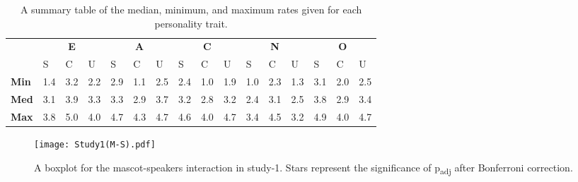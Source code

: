 \begin{table}[hbt!]
    \renewcommand{\arraystretch}{1}
    \begin{center}
        \begin{tabular}{p{}|
        p{}|p{}|p{}||
        p{}|p{}|p{}||
        p{}|p{}|p{}||
        p{}|p{}|p{}||
        p{}|p{}|p{}|}
            \cline{2-16}
            & \multicolumn{3}{c||}{\textbf{E}} & \multicolumn{3}{c||}{\textbf{A}}
            & \multicolumn{3}{c||}{\textbf{C}} &  \multicolumn{3}{c||}{\textbf{N}} & \multicolumn{3}{c|}{\textbf{O}} \\
            \cline{2-16}
            & S & C & U & S & C & U & S & C & U & S & C & U & S & C & U            \\
            \cline{2-16}
            \textbf{Min}    & 1.4 & 3.2 & 2.2 & 2.9 & 1.1 & 2.5 & 2.4 & 1.0 & 1.9 & 1.0 & 2.3 & 1.3 & 3.1 & 2.0 & 2.5 \\
            \textbf{Med}    & 3.1 & 3.9 & 3.3 & 3.3 & 2.9 & 3.7 & 3.2 & 2.8 & 3.2 & 2.4 & 3.1 & 2.5 & 3.8 & 2.9 & 3.4\\
            \textbf{Max}    & 3.8 & 5.0 & 4.0 & 4.7 & 4.3 & 4.7 & 4.6 & 4.0 & 4.7 & 3.4 & 4.5 & 3.2 & 4.9 & 4.0 & 4.7\\
            \cline{2-16}
        \end{tabular}
        \caption[]{A summary table of the median, minimum, and maximum rates given for each personality trait.\footnotemark}
        \label{table:medianMS1}
    \end{center}
\end{table}
\begin{figure}[hbt!]
    \centering
    \texttt{[image: Study1(M-S).pdf]}
    \caption[]{A boxplot for the mascot-speakers interaction in study-1.
    Stars represent the significance of p\textsubscript{adj} after Bonferroni correction.\footnotemark}
    \label{fig:MS1}
\end{figure}

